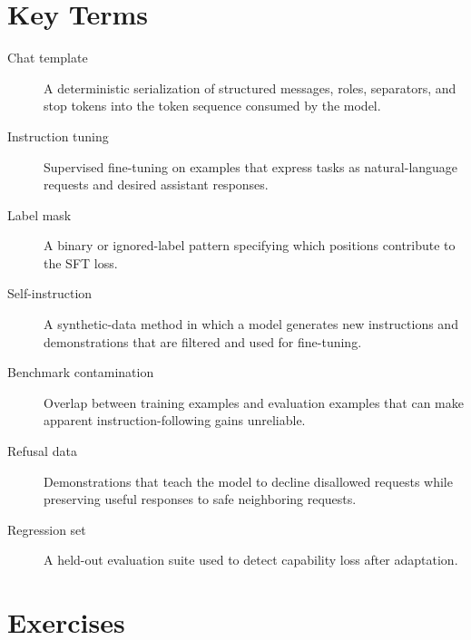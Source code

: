 \section{Key Terms}
\label{sec:sft-key-terms}

\begin{description}
\item[Chat template] A deterministic serialization of structured messages, roles, separators, and stop tokens into the token sequence consumed by the model.
\item[Instruction tuning] Supervised fine-tuning on examples that express tasks as natural-language requests and desired assistant responses.
\item[Label mask] A binary or ignored-label pattern specifying which positions contribute to the SFT loss.
\item[Self-instruction] A synthetic-data method in which a model generates new instructions and demonstrations that are filtered and used for fine-tuning.
\item[Benchmark contamination] Overlap between training examples and evaluation examples that can make apparent instruction-following gains unreliable.
\item[Refusal data] Demonstrations that teach the model to decline disallowed requests while preserving useful responses to safe neighboring requests.
\item[Regression set] A held-out evaluation suite used to detect capability loss after adaptation.
\end{description}

\section{Exercises}
\label{sec:sft-exercises}

